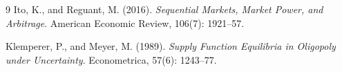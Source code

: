 \documentclass[11pt,a4paper]{article}
\theoremstyle{definition}
\theoremstyle{remark}
\theoremstyle{plain}
\begin{document}
\clearpage
\renewcommand{\refname}{References}
\begin{thebibliography}{9}
Ito, K., and Reguant, M. (2016). \emph{Sequential Markets, Market Power, and Arbitrage}. American Economic Review, 106(7): 1921--57.

Klemperer, P., and Meyer, M. (1989). \emph{Supply Function Equilibria in Oligopoly under Uncertainty}. Econometrica, 57(6): 1243--77.
\end{thebibliography}
\end{document}
